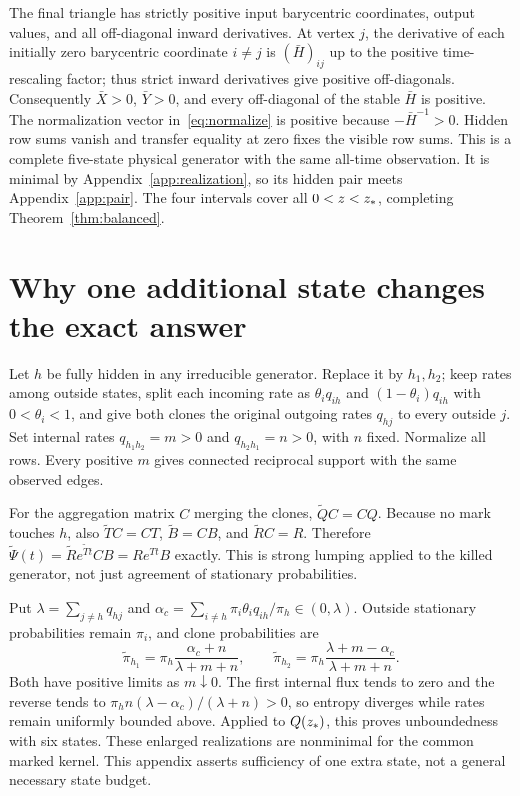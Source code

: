 The final triangle has strictly positive input barycentric coordinates, output values, and all off-diagonal inward derivatives. At vertex $j$, the derivative of each initially zero barycentric coordinate $i\ne j$ is $(\bar H)_{ij}$ up to the positive time-rescaling factor; thus strict inward derivatives give positive off-diagonals. Consequently $\bar X>0$, $\bar Y>0$, and every off-diagonal of the stable $\bar H$ is positive. The normalization vector in~\eqref{eq:normalize} is positive because $-\bar H^{-1}>0$. Hidden row sums vanish and transfer equality at zero fixes the visible row sums. This is a complete five-state physical generator with the same all-time observation. It is minimal by Appendix~\ref{app:realization}, so its hidden pair meets Appendix~\ref{app:pair}. The four intervals cover all $0<z<z_*$, completing Theorem~\ref{thm:balanced}.

\section{Why one additional state changes the exact answer}\label{app:split}
Let $h$ be fully hidden in any irreducible generator. Replace it by $h_1,h_2$; keep rates among outside states, split each incoming rate as $\theta_iq_{ih}$ and $(1-\theta_i)q_{ih}$ with $0<\theta_i<1$, and give both clones the original outgoing rates $q_{hj}$ to every outside $j$. Set internal rates $q_{h_1h_2}=m>0$ and $q_{h_2h_1}=n>0$, with $n$ fixed. Normalize all rows. Every positive $m$ gives connected reciprocal support with the same observed edges.

For the aggregation matrix $C$ merging the clones, $\widetilde Q C=CQ$. Because no mark touches $h$, also $\widetilde T C=CT$, $\widetilde B=CB$, and $\widetilde R C=R$. Therefore $\widetilde\Psi(t)=\widetilde R e^{\widetilde Tt}CB=Re^{Tt}B$ exactly. This is strong lumping applied to the killed generator, not just agreement of stationary probabilities.

Put $\lambda=\sum_{j\ne h}q_{hj}$ and $\alpha_c=\sum_{i\ne h}\pi_i\theta_iq_{ih}/\pi_h\in(0,\lambda)$. Outside stationary probabilities remain $\pi_i$, and clone probabilities are
\begin{equation}
 \widetilde\pi_{h_1}=\pi_h\frac{\alpha_c+n}{\lambda+m+n},\qquad
 \widetilde\pi_{h_2}=\pi_h\frac{\lambda+m-\alpha_c}{\lambda+m+n}.
\end{equation}
Both have positive limits as $m\downarrow0$. The first internal flux tends to zero and the reverse tends to $\pi_hn(\lambda-\alpha_c)/(\lambda+n)>0$, so entropy diverges while rates remain uniformly bounded above. Applied to $Q(z_*)$, this proves unboundedness with six states. These enlarged realizations are nonminimal for the common marked kernel. This appendix asserts sufficiency of one extra state, not a general necessary state budget.



